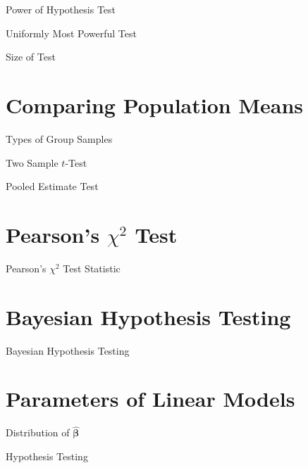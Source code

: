 \documentclass[11pt,a4paper]{article}
\begin{document}
\begin{definition}{Power of Hypothesis Test}

\end{definition}

\begin{definition}{Uniformly Most Powerful Test}

\end{definition}

\begin{definition}{Size of Test}

\end{definition}

\section{Comparing Population Means}

\begin{definition}{Types of Group Samples}

\end{definition}

\begin{definition}{Two Sample $t$-Test}

\end{definition}

\begin{definition}{Pooled Estimate Test}

\end{definition}

\section{Pearson's $\chi^2$ Test}

\begin{definition}{Pearson's $\chi^2$ Test Statistic}

\end{definition}

\section{Bayesian Hypothesis Testing}

\begin{definition}{Bayesian Hypothesis Testing}

\end{definition}

\section{Parameters of Linear Models}

\begin{theorem}{Distribution of $\hat{\pmb\beta}$}

\end{theorem}

\begin{remark}{Hypothesis Testing}

\end{remark}
\end{document}
